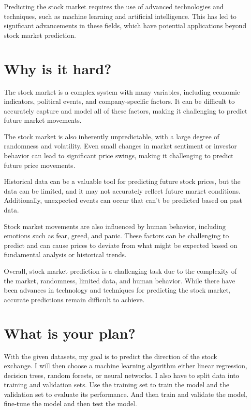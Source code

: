 \documentclass{article}
\begin{document}
Predicting the stock market requires the use of advanced technologies and techniques, such as machine learning and artificial intelligence. This has led to significant advancements in these fields, which have potential applications beyond stock market prediction. 


\section{Why is it hard? }
The stock market is a complex system with many variables, including economic indicators, political events, and company-specific factors. It can be difficult to accurately capture and model all of these factors, making it challenging to predict future market movements.

The stock market is also inherently unpredictable, with a large degree of randomness and volatility. Even small changes in market sentiment or investor behavior can lead to significant price swings, making it challenging to predict future price movements.

Historical data can be a valuable tool for predicting future stock prices, but the data can be limited, and it may not accurately reflect future market conditions. Additionally, unexpected events can occur that can't be predicted based on past data.

Stock market movements are also influenced by human behavior, including emotions such as fear, greed, and panic. These factors can be challenging to predict and can cause prices to deviate from what might be expected based on fundamental analysis or historical trends.

Overall, stock market prediction is a challenging task due to the complexity of the market, randomness, limited data, and human behavior. While there have been advances in technology and techniques for predicting the stock market, accurate predictions remain difficult to achieve.


\section{What is your plan?}
With the given datasets, my goal is to predict the direction of the stock exchange. I will then choose a machine learning algorithm either linear regression, decision trees, random forests, or neural networks. I also have to split data into training and validation sets. Use the training set to train the model and the validation set to evaluate its performance. And then train and validate the model, fine-tune the model and then test the model. 
\end{document}
